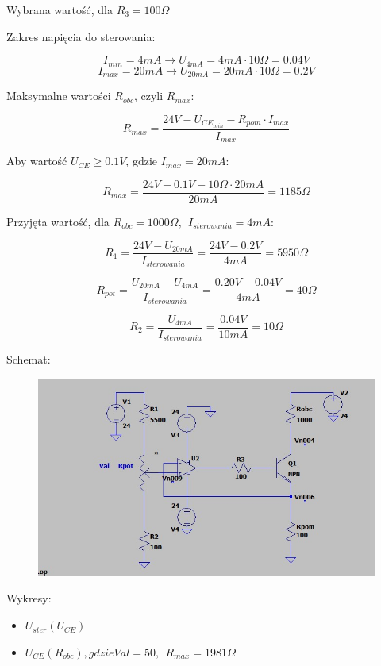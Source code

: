 \documentclass{article}
\begin{document}
Wybrana wartość, dla $R_{3} = 100 \Omega$

Zakres napięcia do sterowania:

$$
    I_{min} = 4mA \rightarrow U_{4mA} = 4mA \cdot 10 \Omega = 0.04V
$$
$$
    I_{max} = 20mA \rightarrow U_{20mA} = 20mA \cdot 10 \Omega = 0.2V
$$

Maksymalne wartości $R_{obc}$, czyli $R_{max}$:

$$
    R_{max} = \frac{24V-U_{CE_{min}}-R_{pom}\cdot I_{max}}{I_{max}}
$$

Aby wartość $U_{CE} \geq 0.1V$, gdzie $I_{max}=20mA$:

$$
    R_{max}=\frac{24V-0.1V-10\Omega \cdot 20mA}{20mA}=1185\Omega
$$

Przyjęta wartość, dla $R_{obc} = 1000 \Omega, \ \ I_{sterowania} = 4mA$:

$$
    R_{1} = \frac{24V - U_{20mA}}{I_{sterowania}}=\frac{24V - 0.2V}{4mA} = 5950 \Omega
$$

$$
    R_{pot} = \frac{U_{20mA} - U_{4mA}}{I_{sterowania}} = 
    \frac{0.20V-0.04V}{4mA} = 40\Omega
$$


$$
    R_{2} = \frac{U_{4mA}}{I_{sterowania}} = \frac{0.04V}{10mA} = 10 \Omega
$$

Schemat:

\begin{figure}[h!]
    \centering
    \includegraphics[scale=0.5]{schemat_R_POM_100.jpg}
\end{figure}
\newpage
Wykresy:

\begin{itemize}
    \item $U_{ster}(U_{CE})$
    \item $U_{CE}(R_{obc}), gdzie Val = 50, \ \ R_{max} = 1981 \Omega$
\end{itemize}
\end{document}

